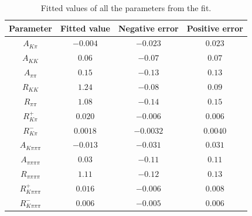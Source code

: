 \begin{table}[h]
\centering
{\footnotesize
\begin{tabular}{cccc}
Parameter & Fitted value & Negative error & Positive error \\
\hline
$A_{K\pi}$ & $-0.004$ & $-0.023$ & $0.023$ \\
$A_{KK}$ & $0.06$ & $-0.07$ & $0.07$ \\
$A_{\pi\pi}$ & $0.15$ & $-0.13$ & $0.13$ \\
$R_{KK}$ & $1.24$ & $-0.08$ & $0.09$ \\
$R_{\pi\pi}$ & $1.08$ & $-0.14$ & $0.15$ \\
$R^+_{K\pi}$ & $0.020$ & $-0.006$ & $0.006$ \\
$R^-_{K\pi}$ & $0.0018$ & $-0.0032$ & $0.0040$ \\
$A_{K\pi\pi\pi}$ & $-0.013$ & $-0.031$ & $0.031$ \\
$A_{\pi\pi\pi\pi}$ & $0.03$ & $-0.11$ & $0.11$ \\
$R_{\pi\pi\pi\pi}$ & $1.11$ & $-0.12$ & $0.13$ \\
$R^+_{K\pi\pi\pi}$ & $0.016$ & $-0.006$ & $0.008$ \\
$R^-_{K\pi\pi\pi}$ & $0.006$ & $-0.005$ & $0.006$ \\
\end{tabular}}
\caption{Fitted values of all the \CP parameters from the \CP fit.}
\label{cpfitresultsphysics}
\end{table}

